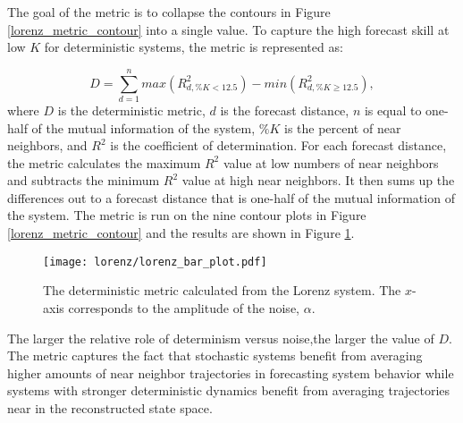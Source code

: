 The goal of the metric is to collapse the contours in Figure \ref{lorenz_metric_contour} into a single value. To capture the high forecast skill at low $K$ for deterministic systems, the metric is represented as:

$$ D = \sum^n_{d=1} max(R^2_{d,\%K<12.5}) - min(R^2_{d,\%K\geq12.5}), $$
where $D$ is the deterministic metric, $d$ is the forecast distance, $n$ is equal to one-half of the mutual information of the system, $\%K$ is the percent of near neighbors, and $R^2$ is the coefficient of determination. For each forecast distance, the metric calculates the maximum $R^2$ value at low numbers of near neighbors and subtracts the minimum $R^2$ value at high near neighbors. It then sums up the differences out to a forecast distance that is one-half of the mutual information of the system. The metric is run on the nine contour plots in Figure \ref{lorenz_metric_contour} and the results are shown in Figure \ref{lorenz_metric_bar}. 

\begin{figure}[htbp]  %
   \centering
   \texttt{[image: lorenz/lorenz\_bar\_plot.pdf]} 
   \caption{The deterministic metric calculated from the Lorenz system. The $x$-axis corresponds to the amplitude of the noise, $\alpha$.}
   \label{lorenz_metric_bar}
\end{figure}

The larger the relative role of determinism versus noise,the larger the value of $D$. The metric captures the fact that stochastic systems benefit from averaging higher amounts of near neighbor trajectories in forecasting system behavior while systems with stronger deterministic dynamics benefit from averaging trajectories near in the reconstructed state space. 

%









%